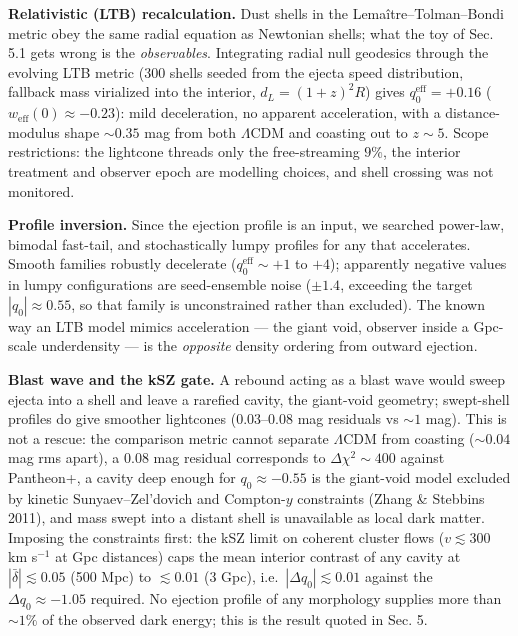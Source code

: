 \documentclass[
]{article}
\begin{document}
\textbf{Relativistic (LTB) recalculation.} Dust shells in the
Lemaître--Tolman--Bondi metric obey the same radial equation as
Newtonian shells; what the toy of Sec. 5.1 gets wrong is the
\emph{observables}. Integrating radial null geodesics through the
evolving LTB metric (300 shells seeded from the ejecta speed
distribution, fallback mass virialized into the interior,
\(d_L = (1+z)^2 R\)) gives \(q_0^{\text{eff}} = +0.16\)
(\(w_{\text{eff}}(0) \approx -0.23\)): mild deceleration, no apparent
acceleration, with a distance-modulus shape \(\sim\!0.35\) mag from both
\(\Lambda\)CDM and coasting out to \(z \sim 5\). Scope restrictions: the
lightcone threads only the free-streaming \(9\%\), the interior
treatment and observer epoch are modelling choices, and shell crossing
was not monitored.

\textbf{Profile inversion.} Since the ejection profile is an input, we
searched power-law, bimodal fast-tail, and stochastically lumpy profiles
for any that accelerates. Smooth families robustly decelerate
(\(q_0^{\text{eff}} \sim +1\) to \(+4\)); apparently negative values in
lumpy configurations are seed-ensemble noise (\(\pm 1.4\), exceeding the
target \(|q_0| \approx 0.55\), so that family is unconstrained rather
than excluded). The known way an LTB model mimics acceleration --- the
giant void, observer inside a Gpc-scale underdensity --- is the
\emph{opposite} density ordering from outward ejection.

\textbf{Blast wave and the kSZ gate.} A rebound acting as a blast wave
would sweep ejecta into a shell and leave a rarefied cavity, the
giant-void geometry; swept-shell profiles do give smoother lightcones
(\(0.03\)--\(0.08\) mag residuals vs \(\sim\!1\) mag). This is not a
rescue: the comparison metric cannot separate \(\Lambda\)CDM from
coasting (\(\sim\!0.04\) mag rms apart), a \(0.08\) mag residual
corresponds to \(\Delta\chi^2 \sim 400\) against Pantheon+, a cavity
deep enough for \(q_0 \approx -0.55\) is the giant-void model excluded
by kinetic Sunyaev--Zel'dovich and Compton-\(y\) constraints (Zhang \&
Stebbins 2011), and mass swept into a distant shell is unavailable as
local dark matter. Imposing the constraints first: the kSZ limit on
coherent cluster flows (\(v \lesssim 300\) km s\(^{-1}\) at Gpc
distances) caps the mean interior contrast of any cavity at
\(|\bar\delta| \lesssim 0.05\) (500 Mpc) to \(\lesssim 0.01\) (3 Gpc),
i.e.~\(|\Delta q_0| \lesssim 0.01\) against the
\(\Delta q_0 \approx -1.05\) required. No ejection profile of any
morphology supplies more than \(\sim\!1\%\) of the observed dark energy;
this is the result quoted in Sec. 5.
\end{document}
